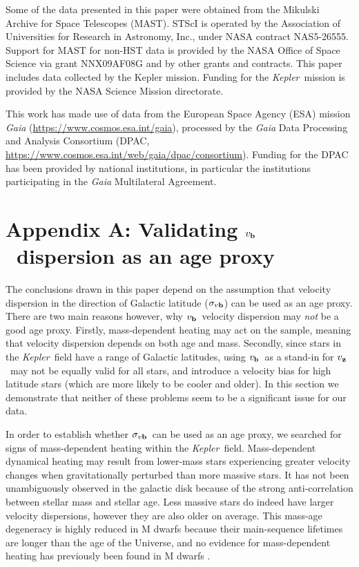 \documentclass{aastex63}
\newcommand{\eg}{{\it e.g.}}
\newcommand{\kepler}{{\it Kepler}}
\newcommand{\Kepler}{{\it Kepler}}
\newcommand{\vz}{$v_{\bf z}$}
\newcommand{\vb}{$v_{\bf b}$}
\newcommand{\sigmavb}{$\sigma_{v{\bf b}}$}
\begin{document}
Some of the data presented in this paper were obtained from the Mikulski
Archive for Space Telescopes (MAST).
STScI is operated by the Association of Universities for Research in
Astronomy, Inc., under NASA contract NAS5-26555.
Support for MAST for non-HST data is provided by the NASA Office of Space
Science via grant NNX09AF08G and by other grants and contracts.
This paper includes data collected by the Kepler mission. Funding for the
\Kepler\ mission is provided by the NASA Science Mission directorate.

This work has made use of data from the European Space Agency (ESA) mission
{\it Gaia} (\url{https://www.cosmos.esa.int/gaia}), processed by the {\it
Gaia} Data Processing and Analysis Consortium (DPAC,
\url{https://www.cosmos.esa.int/web/gaia/dpac/consortium}).
Funding for the DPAC has been provided by national institutions, in particular
the institutions participating in the {\it Gaia} Multilateral Agreement.

\section{Appendix A: Validating \vb\ dispersion as an age proxy}
\label{sec:mass-dependent-heating}

The conclusions drawn in this paper depend on the assumption that velocity
dispersion in the direction of Galactic latitude (\sigmavb) can be used as an
age proxy.
There are two main reasons however, why \vb\ velocity dispersion may {\it not}
be a good age proxy.
Firstly, mass-dependent heating may act on the sample, meaning that velocity
dispersion depends on both age and mass.
Secondly, since stars in the \kepler\ field have a range of Galactic
latitudes, using \vb\ as a stand-in for \vz\ may not be equally valid for all
stars, and introduce a velocity bias for high latitude stars (which are more
likely to be cooler and older).
In this section we demonstrate that neither of these problems seem to be a
significant issue for our data.

In order to establish whether \sigmavb\ can be used as an age proxy, we
searched for signs of mass-dependent heating within the \kepler\ field.
Mass-dependent dynamical heating may result from lower-mass stars experiencing
greater velocity changes when gravitationally perturbed than more massive
stars.
It has not been unambiguously observed in the galactic disk because of the
strong anti-correlation between stellar mass and stellar age.
Less massive stars do indeed have larger velocity dispersions, however they
are also older on average.
This mass-age degeneracy is highly reduced in M dwarfs because their
main-sequence lifetimes are longer than the age of the Universe, and no
evidence for mass-dependent heating has previously been found in M dwarfs
\citep[\eg][]{faherty2009, newton2016}.
\end{document}
